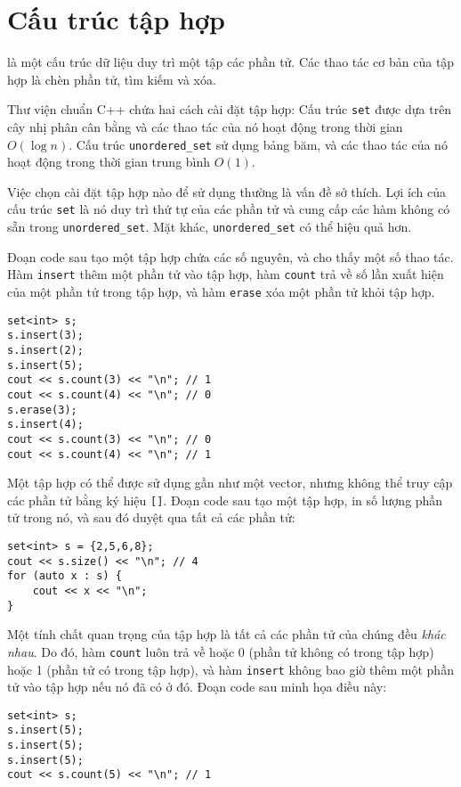 \section{Cấu trúc tập hợp}


 là một cấu trúc dữ liệu
duy trì một tập các phần tử.
Các thao tác cơ bản của tập hợp là chèn phần tử,
tìm kiếm và xóa.

Thư viện chuẩn C++ chứa hai cách cài đặt
tập hợp:
Cấu trúc \texttt{set} được dựa trên cây nhị phân cân bằng
và các thao tác của nó hoạt động trong thời gian $O(\log n)$.
Cấu trúc \texttt{unordered\_set} sử dụng bảng băm,
và các thao tác của nó hoạt động trong thời gian trung bình $O(1)$.

Việc chọn cài đặt tập hợp nào để sử dụng
thường là vấn đề sở thích.
Lợi ích của cấu trúc \texttt{set}
là nó duy trì thứ tự của các phần tử
và cung cấp các hàm không có sẵn
trong \texttt{unordered\_set}.
Mặt khác, \texttt{unordered\_set}
có thể hiệu quả hơn.

Đoạn code sau tạo một tập hợp
chứa các số nguyên,
và cho thấy một số thao tác.
Hàm \texttt{insert} thêm một phần tử vào tập hợp,
hàm \texttt{count} trả về số lần xuất hiện
của một phần tử trong tập hợp,
và hàm \texttt{erase} xóa một phần tử khỏi tập hợp.

\begin{lstlisting}
set<int> s;
s.insert(3);
s.insert(2);
s.insert(5);
cout << s.count(3) << "\n"; // 1
cout << s.count(4) << "\n"; // 0
s.erase(3);
s.insert(4);
cout << s.count(3) << "\n"; // 0
cout << s.count(4) << "\n"; // 1
\end{lstlisting}

Một tập hợp có thể được sử dụng gần như một vector,
nhưng không thể truy cập
các phần tử bằng ký hiệu \texttt{[]}.
Đoạn code sau tạo một tập hợp,
in số lượng phần tử trong nó, và sau đó
duyệt qua tất cả các phần tử:
\begin{lstlisting}
set<int> s = {2,5,6,8};
cout << s.size() << "\n"; // 4
for (auto x : s) {
    cout << x << "\n";
}
\end{lstlisting}

Một tính chất quan trọng của tập hợp là
tất cả các phần tử của chúng đều \emph{khác nhau}.
Do đó, hàm \texttt{count} luôn trả về
hoặc 0 (phần tử không có trong tập hợp)
hoặc 1 (phần tử có trong tập hợp),
và hàm \texttt{insert} không bao giờ thêm
một phần tử vào tập hợp nếu nó đã
có ở đó.
Đoạn code sau minh họa điều này:

\begin{lstlisting}
set<int> s;
s.insert(5);
s.insert(5);
s.insert(5);
cout << s.count(5) << "\n"; // 1
\end{lstlisting}

